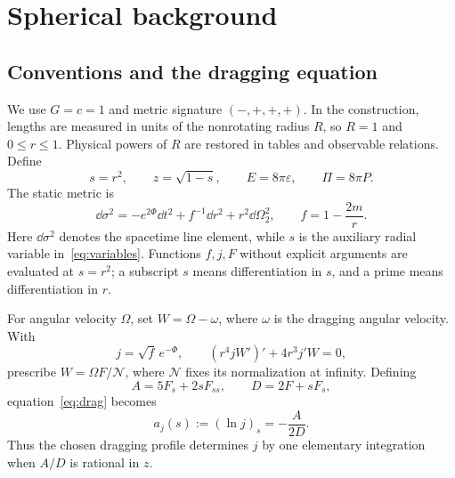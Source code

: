 \section{Spherical background}
\subsection{Conventions and the dragging equation}
We use $G=c=1$ and metric signature $(-,+,+,+)$. In the construction, lengths are measured in units of the nonrotating radius $R$, so $R=1$ and $0\le r\le1$. Physical powers of $R$ are restored in tables and observable relations. Define
\begin{equation}
 s=r^2,\qquad z=\sqrt{1-s},\qquad
 E=8\pi\varepsilon,\qquad \Pi=8\pi P.
 \label{eq:variables}
\end{equation}
The static metric is
\begin{equation}
 \dd\sigma^2=-e^{2\Phi}\dd t^2+f^{-1}\dd r^2+r^2\dd\Omega_2^2,
 \qquad f=1-\frac{2m}{r}.
 \label{eq:staticmetric}
\end{equation}
Here $\dd\sigma^2$ denotes the spacetime line element, while $s$ is the auxiliary radial variable in~\eqref{eq:variables}. Functions $f,j,F$ without explicit arguments are evaluated at $s=r^2$; a subscript $s$ means differentiation in $s$, and a prime means differentiation in $r$.

For angular velocity $\Omega$, set $W=\Omega-\omega$, where $\omega$ is the dragging angular velocity. With
\begin{equation}
 j=\sqrt f\,e^{-\Phi},
 \qquad (r^4jW')'+4r^3j'W=0,
 \label{eq:drag}
\end{equation}
prescribe $W=\Omega F/\mathcal N$, where $\mathcal N$ fixes its normalization at infinity. Defining
\begin{equation}
 A=5F_s+2sF_{ss},\qquad D=2F+sF_s,
 \label{eq:AD}
\end{equation}
equation~\eqref{eq:drag} becomes
\begin{equation}
 a_j(s):=(\ln j)_s=-\frac{A}{2D}.
 \label{eq:a}
\end{equation}
Thus the chosen dragging profile determines $j$ by one elementary integration when $A/D$ is rational in $z$.

